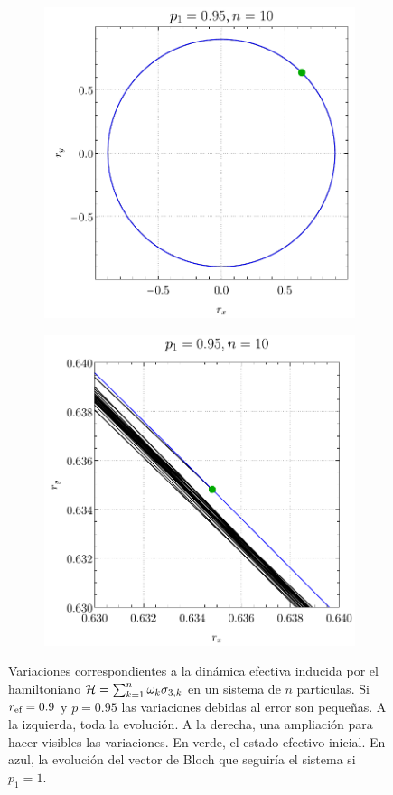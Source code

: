 \begin{figure}[ht!]
    \centering
    \begin{subfigure}{0.5\textwidth}
      \centering
      \includegraphics[width=0.9\linewidth]{chapter4/figures_separable/local_all_ran_p=0.95_r=0.9_n=10_a=-3_b=3full.pdf}
    \end{subfigure}%
    \begin{subfigure}{0.5\textwidth}
      \centering
      \includegraphics[width=0.9\linewidth]{chapter4/figures_separable/local_all_ran_p=0.95_r=0.9_n=10_a=-3_b=3.pdf}
    \end{subfigure}
    \caption{Variaciones correspondientes a la dinámica efectiva inducida por el hamiltoniano $\mathcal{H}=\sum_{k=1}^{n}\omega_{k}\sigma_{3,k}$ en un sistema de $n$ partículas. Si $r_{\text{ef}}=0.9$ y $p=0.95$ las variaciones debidas al error son pequeñas. A la izquierda, toda la evolución. A la derecha, una ampliación para hacer visibles las variaciones. En verde, el estado efectivo inicial. En azul, la evolución del vector de Bloch que seguiría el sistema si $p_{1}=1$. \label{fig:Oscilations12}}
\end{figure}
